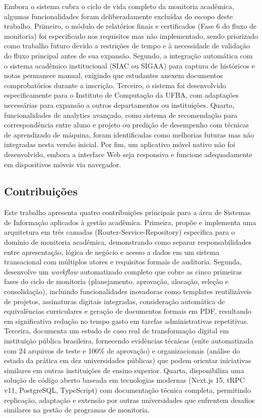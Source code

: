 \documentclass[portuguese]{sbc2025}%
\begin{document}
Embora o sistema cubra o ciclo de vida completo da monitoria acadêmica, algumas funcionalidades foram deliberadamente excluídas do escopo deste trabalho. Primeiro, o módulo de relatórios finais e certificados (Fase 6 do fluxo de monitoria) foi especificado nos requisitos mas não implementado, sendo priorizado como trabalho futuro devido a restrições de tempo e à necessidade de validação do fluxo principal antes de sua expansão. Segundo, a integração automática com o sistema acadêmico institucional (SIAC ou SIGAA) para captura de históricos e notas permanece manual, exigindo que estudantes anexem documentos comprobatórios durante a inscrição. Terceiro, o sistema foi desenvolvido especificamente para o Instituto de Computação da UFBA, com adaptações necessárias para expansão a outros departamentos ou instituições. Quarto, funcionalidades de analytics avançado, como sistema de recomendação para correspondência entre aluno e projeto ou predição de desempenho com técnicas de aprendizado de máquina, foram identificadas como melhorias futuras mas não integradas nesta versão inicial. Por fim, um aplicativo móvel nativo não foi desenvolvido, embora a interface Web seja responsiva e funcione adequadamente em dispositivos móveis via navegador.

\subsection{Contribuições}

Este trabalho apresenta quatro contribuições principais para a área de Sistemas de Informação aplicados à gestão acadêmica. Primeira, propõe e implementa uma arquitetura em três camadas (Router-Service-Repository) específica para o domínio de monitoria acadêmica, demonstrando como separar responsabilidades entre apresentação, lógica de negócio e acesso a dados em um sistema transacional com múltiplos atores e requisitos formais de auditoria. Segunda, desenvolve um \textit{workflow} automatizado completo que cobre as cinco primeiras fases do ciclo de monitoria (planejamento, aprovação, alocação, seleção e consolidação), incluindo funcionalidades inovadoras como templates reutilizáveis de projetos, assinaturas digitais integradas, consideração automática de equivalências curriculares e geração de documentos formais em PDF, resultando em significativa redução no tempo gasto em tarefas administrativas repetitivas. Terceira, documenta um estudo de caso real de transformação digital em instituição pública brasileira, fornecendo evidências técnicas (suíte automatizada com 24 arquivos de teste e 100\% de aprovação) e organizacionais (análise do estado da prática em dez universidades públicas) que podem orientar iniciativas similares em outras instituições de ensino superior. Quarta, disponibiliza uma solução de código aberto baseada em tecnologias modernas (Next.js 15, tRPC v11, PostgreSQL, TypeScript) com documentação técnica completa, permitindo replicação, adaptação e extensão por outras universidades que enfrentem desafios similares na gestão de programas de monitoria.
\end{document}
